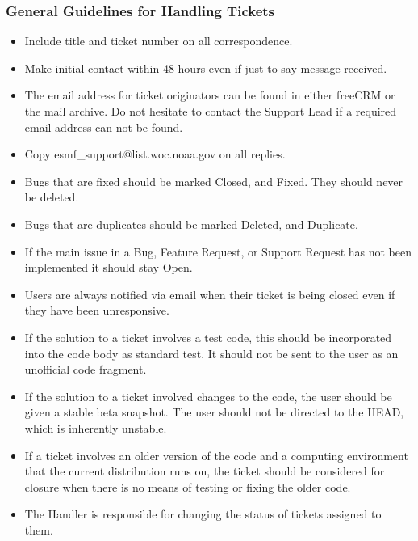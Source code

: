 \subsubsection{General Guidelines for Handling Tickets}
\begin{itemize}
\item Include title and ticket number on all correspondence.
\item Make initial contact within 48 hours even if just to say message received.
\item The email address for ticket originators can be found in either freeCRM or the mail archive. Do not hesitate to contact the Support Lead if a required email address can not be found. 
\item Copy esmf\_support@list.woc.noaa.gov on all replies.
\item Bugs that are fixed should be marked Closed, and Fixed. They should never be deleted. 
\item Bugs that are duplicates should be marked Deleted, and Duplicate. 
\item If the main issue in a Bug, Feature Request, or Support Request has not been implemented it should stay Open.
\item Users are always notified via email when their ticket is being closed even if they have been unresponsive.  
\item If the solution to a ticket involves a test code, this should be incorporated into the code body as standard test. It should not be sent to the user as an unofficial code fragment. 
\item If the solution to a ticket involved changes to the code, the user should be given a stable beta snapshot. The user should not be directed to the HEAD, which is inherently unstable.  
\item If a ticket involves an older version of the code and a computing environment that the current distribution runs on, the ticket should be considered for closure when there is no means of testing or fixing the older code. 
\item The Handler is responsible for changing the status of tickets assigned to them.  
\end{itemize}


